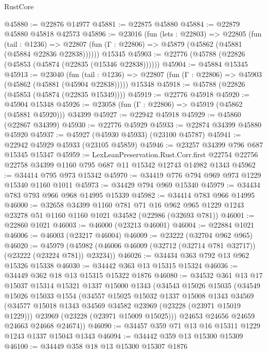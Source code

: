 \begin{lexlean}{RustCore}
\begin{coremodule}
@45880 := @22876 @14977
@45881 := @22875 @45880
@45884 := @22879 @45880 @45818 @42573
@45896 := @23016
    (fun (lets : @22803) =>
    @22805
      (fun (tail : @1236) =>
      @22807 (fun (Γ : @22806) => @45879 (@45862 (@45881 (@45884 @22836 @22838))))))
    @15345
@45903 := @22776 (@45788 (@22826 (@45853 (@45874 (@22835 (@15346 @22838))))))
@45904 := @45884 @15345
@45913 := @23040
    (fun (tail : @1236) => @22807 (fun (Γ : @22806) => @45903 (@45862 (@45881 (@45904 @22838)))))
    @15348
@45918 := @45788 (@22826 (@45853 (@45874 (@22835 @15349))))
@45919 := @22776 @45918
@45920 := @45904 @15348
@45926 := @23058 (fun (Γ : @22806) => @45919 (@45862 (@45881 @45920))) @34399
@45927 := @22942 @45918
@45929 := @45860 (@22867 @34399)
@45930 := @22776 @45929
@45933 := @22874 @34399 @45880 @45920
@45937 := @45927 (@45930 @45933) (@23100 @45787)
@45941 := @22942 @45929 @45933 (@23105 @45859)
@45946 := @23257 @34399 @796 @687 @15345 @15347
@45959 := LexLeanPreservation.Rust.Corr.first
    @22754
    @22756
    @22758
    @34399
    @1160
    @795
    @687
    @11
    @15342
    @12743
    @14982
    @1343
@45962 := @34414 @795 @973 @15342
@45970 := @34419 @776 @794 @969 @973 @1229 @15340 @1160 @1011
@45973 := @34429 @794 @969 @15340
@45979 := @34434 @783 @793 @966 @968 @14995 @15339
@45982 := @34414 @783 @966 @14995
@46000 := @32658
    @34399
    @1160
    @781
    @71
    @16
    @962
    @965
    @1229
    @1243
    @23278
    @51
    @1160
    @1160
    @1021
    @34582
    (@22986 (@32693 @781))
@46001 := @22860 @1021
@46003 := @46000 (@23213 @46001)
@46004 := @22884 @1021
@46006 := @46003 (@23217 @46004)
@46009 := @23222 (@32704 @962 @965)
@46020 := @45979
    (@45982 (@46006 @46009 (@32712 (@32714 @781 @32717)) (@23222 (@23224 @781)) @23234))
@46026 := @34434 @363 @792 @13 @962 @15326 @15338
@46030 := @34442 @363 @13 @15315 @15324
@46036 := @34449 @362 @18 @13 @15315 @15322 @1876
@46080 := @34532
    @361
    @13
    @17
    @15037
    @15314
    @15321
    @1337
    @15000
    @1343
    (@34543
      @15026
      @15035
      (@34549
        @15026
        @15033
        @1554
        (@34557
          @15025
          @15032
          @1337
          @15008
          @1343
          @34569
          (@34577 @15018 @1343 @34569 @34582 @23969 (@23228 (@23971 @15019 @1229)))
          @23969
          (@23228 (@23971 @15009 @15025)))
        @24653
        @24656
        @24659
        @24663
        @24668
        @24674))
@46090 := @34457 @359 @71 @13 @16 @15311 @1229 @1243 @1337 @15043 @1343
@46094 := @34442 @359 @13 @15300 @15309
@46100 := @34449 @358 @18 @13 @15300 @15307 @1876

\end{coremodule}
\end{lexlean}
